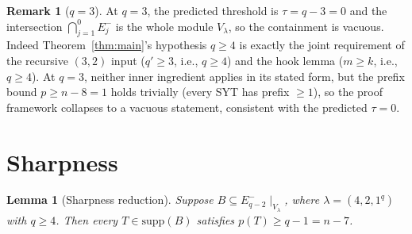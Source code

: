 \documentclass[11pt]{article}
\newtheorem{lemma}[theorem]{Lemma}
\theoremstyle{definition}
\newtheorem{remark}[theorem]{Remark}
\newcommand{\supp}{\mathrm{supp}}
\begin{document}
\begin{remark}[$q = 3$]\label{rem:q3-vacuous}
At $q = 3$, the predicted threshold is $\tau = q - 3 = 0$ and the
intersection $\bigcap_{j=1}^0 E_j^-$ is the whole module $V_\lambda$,
so the containment is vacuous.  Indeed Theorem~\ref{thm:main}'s
hypothesis $q \ge 4$ is exactly the joint requirement of the
recursive $(3, 2)$ input ($q' \ge 3$, i.e., $q \ge 4$) and the hook
lemma ($m \ge k$, i.e., $q \ge 4$).  At $q = 3$, neither inner
ingredient applies in its stated form, but the prefix bound
$p \ge n - 8 = 1$ holds trivially (every SYT has prefix $\ge 1$),
so the proof framework collapses to a vacuous statement, consistent
with the predicted $\tau = 0$.
\end{remark}

\section{Sharpness}\label{sec:sharp}

\begin{lemma}[Sharpness reduction]\label{lem:sharp-reduction}
Suppose $B \subseteq E_{q-2}^-\!\mid_{V_\lambda}$, where $\lambda =
(4, 2, 1^q)$ with $q \ge 4$.  Then every $T \in \supp(B)$ satisfies
$p(T) \ge q - 1 = n - 7$.
\end{lemma}
\end{document}

